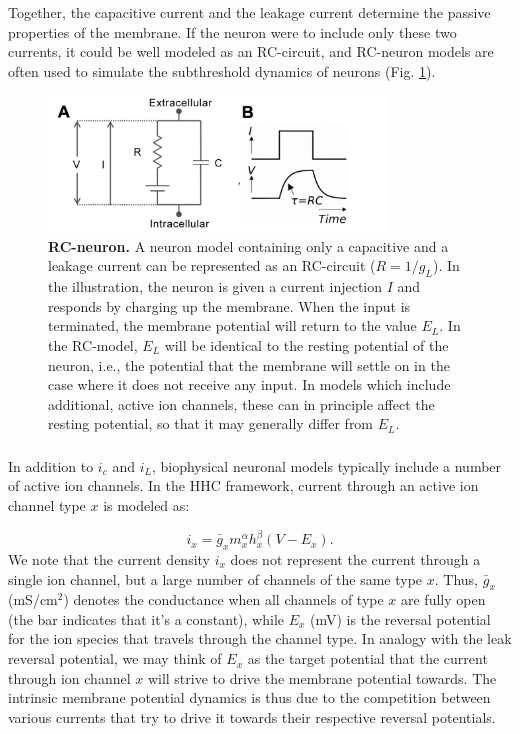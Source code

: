 Together, the capacitive current and the leakage current determine the passive properties of the membrane. If the neuron were to include only these two currents, it could be well modeled as an RC-circuit, and RC-neuron models are often used to simulate the subthreshold dynamics of neurons (Fig. \ref{Neuron:fig:RC}). 

\begin{figure}[!ht]
\begin{center}
\includegraphics[width=0.8\textwidth]{Figures/Neuron/RCneuron.png}
\end{center}
\caption{\textbf{RC-neuron.}  A neuron model containing only a capacitive and a leakage current can be represented as an RC-circuit ($R = 1/g_L$). In the illustration, the neuron is given a current injection $I$ and responds by charging up the membrane. When the input is terminated, the membrane potential will return to the value $E_L$. In the RC-model, $E_L$ will be identical to the resting potential of the neuron, i.e., the potential that the membrane will settle on in the case where it does not receive any input. In models which include additional, active ion channels, these can in principle affect the resting potential, so that it may generally differ from $E_L$.
}
\label{Neuron:fig:RC}
\end{figure}


\subsubsection{}
In addition to $i_c$ and $i_L$, biophysical neuronal models typically include a number of active ion channels. In the HHC framework, current through an active ion channel type $x$ is modeled as:

\begin{equation}
i_x = \bar{g}_x m_x^{\alpha} h_x^{\beta}(V-E_x).
\label{eq:HHform}
\end{equation}
We note that the current density $i_x$ does not represent the current through a single ion channel, but a large number of channels of the same type $x$. Thus, $\bar{g}_x$ (mS/cm$^2$) denotes the conductance when all channels of type $x$ are fully open (the bar indicates that it's a constant), while $E_x$ (mV) is the reversal potential for the ion species that travels through the channel type. In analogy with the leak reversal potential, we may think of $E_x$ as the target potential that the current through ion channel $x$ will strive to drive the membrane potential towards. The intrinsic membrane potential dynamics is thus due to the competition between various currents that try to drive it towards their respective reversal potentials. 

